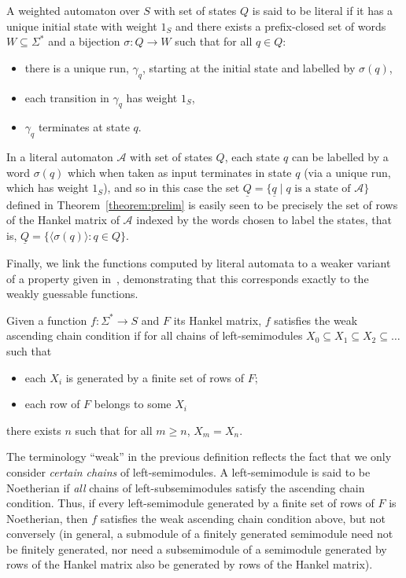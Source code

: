 \documentclass{lmcs}
\numberwithin{theorem}{section}
\begin{document}
\begin{defi}
\label{definition:literal}
A weighted automaton over $S$ with set of states $Q$ is said to be literal if it has a unique initial state with weight $1_S$ and there exists a prefix-closed set of words $W \subseteq \Sigma^*$ and a bijection $\sigma: Q \rightarrow W$ such that for all $q \in Q$:
	\begin{itemize}
		\item there is a unique run, $\gamma_q$, starting at the initial state and labelled by $\sigma(q)$,
		\item each transition in $\gamma_q$ has weight $1_S$,
		\item $\gamma_q$ terminates at state $q$.
	\end{itemize}
\end{defi}
\begin{rem}
\label{rem:litrows}
In a literal automaton $\mathcal{A}$ with set of states $Q$, each state $q$ can be labelled by a word $\sigma(q)$ which when taken as input terminates in  state $q$ (via a unique run, which has weight $1_S$), and so in this case the set $\underline{Q} = \{\underline{q}  \mid q \text{ is a state of } \mathcal{A}\}$ defined in Theorem~\ref{theorem:prelim} is easily seen to be precisely the set of rows of the Hankel matrix of $\mathcal{A}$ indexed by the words chosen to label the states, that is, $\underline{Q} = \{\langle \sigma(q) \rangle: q \in Q\}$.
\end{rem}

Finally, we link the functions computed by literal automata to a weaker variant of a property given in~\cite{HKRS20}, demonstrating that this corresponds exactly to the weakly guessable functions.

\begin{defi}
\label{definition:wacc}
Given a function $f:\Sigma^* \to S$ and $F$ its Hankel matrix, $f$ satisfies the weak ascending chain condition if for all chains of left-semimodules  $X_0 \subseteq X_1 \subseteq X_2 \subseteq \ldots $ such that
\begin{itemize}
    \item each $X_i$ is generated by a finite set of rows of $F$;
    \item each row of $F$ belongs to some $X_i$
\end{itemize}
there exists $n$ such that for all $m \geq n$, $X_m = X_n$.
\end{defi}

\begin{rem}
\label{rem:Noetherian}
The terminology ``weak'' in the previous definition reflects the fact that we only consider \emph{certain chains} of left-semimodules. A left-semimodule is said to be Noetherian if \emph{all} chains of left-subsemimodules satisfy the ascending chain condition.  Thus, if every left-semimodule generated by a finite set of rows of $F$ is Noetherian, then $f$ satisfies the weak ascending chain condition above, but not conversely (in general, a submodule of a finitely generated semimodule need not be finitely generated, nor need a subsemimodule of a semimodule generated by rows of the Hankel matrix also be generated by rows of the Hankel matrix).	
\end{rem}
\end{document}
